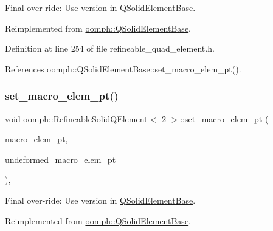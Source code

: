 Final over-\/ride\+: Use version in \hyperlink{classoomph_1_1QSolidElementBase}{Q\+Solid\+Element\+Base}. 



Reimplemented from \hyperlink{classoomph_1_1QSolidElementBase_a0ceca47c039bbb38b0feb3baa330a27f}{oomph\+::\+Q\+Solid\+Element\+Base}.



Definition at line 254 of file refineable\+\_\+quad\+\_\+element.\+h.



References oomph\+::\+Q\+Solid\+Element\+Base\+::set\+\_\+macro\+\_\+elem\+\_\+pt().

\mbox{\label{classoomph_1_1RefineableSolidQElement_3_012_01_4_a8c0cb9d011cc070322945b1fecd03331}} 
\subsubsection{\texorpdfstring{set\+\_\+macro\+\_\+elem\+\_\+pt()}{set\_macro\_elem\_pt()}\hspace{0.1cm}{\footnotesize\ttfamily [2/2]}}
{\footnotesize\ttfamily void \hyperlink{classoomph_1_1RefineableSolidQElement}{oomph\+::\+Refineable\+Solid\+Q\+Element}$<$ 2 $>$\+::set\+\_\+macro\+\_\+elem\+\_\+pt (\begin{DoxyParamCaption}\item[{\hyperlink{classoomph_1_1MacroElement}{Macro\+Element} $\ast$}]{macro\+\_\+elem\+\_\+pt,  }\item[{\hyperlink{classoomph_1_1MacroElement}{Macro\+Element} $\ast$}]{undeformed\+\_\+macro\+\_\+elem\+\_\+pt }\end{DoxyParamCaption})\hspace{0.3cm}{\ttfamily [inline]}, {\ttfamily [virtual]}}



Final over-\/ride\+: Use version in \hyperlink{classoomph_1_1QSolidElementBase}{Q\+Solid\+Element\+Base}. 



Reimplemented from \hyperlink{classoomph_1_1QSolidElementBase_aa7f14a039224fb4c513da587448d2c3b}{oomph\+::\+Q\+Solid\+Element\+Base}.



